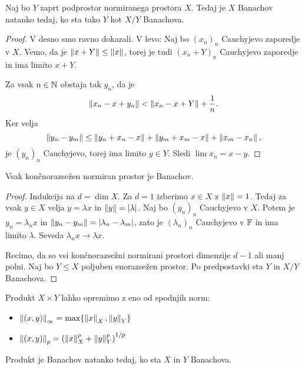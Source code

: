 \begin{trditev}
  Naj bo $Y$ zaprt podprostor normiranega prostora $X$.
  Tedaj je $X$ Banachov natanko tedaj, ko sta tako $Y$ kot $X/Y$ Banachova.
\end{trditev}

\begin{proof}
  V desno smo ravno dokazali.
  V levo:
  Naj bo $(x_n)_n$ Cauchyjevo zaporedje v $X$.
  Vemo, da je $\left\lVert x + Y\right\rVert \le \left\lVert x\right\rVert$, torej je tudi $(x_n + Y)_n$
  Cauchyjevo zaporedje in ima limito $x + Y$.

  Za vsak $n \in \mathbb{N}$ obstaja tak $y_n$, da je
  \[
	\left\lVert x_n - x + y_n\right\rVert < \left\lVert x_n - x + Y\right\rVert + \frac{1}{n}.
  \]
  Ker velja
  \[
	\left\lVert y_n - y_m\right\rVert \le \left\lVert y_n + x_n - x\right\rVert + \left\lVert y_m + x_m - x\right\rVert + \left\lVert x_m
	- x_n\right\rVert,
  \]
  je $(y_n)_n$ Cauchyjevo, torej ima limito $y \in Y$.
  Sledi $\lim x_n = x - y$.
\end{proof}

\begin{posledica}
  Vsak končnorazsežen normiran prostor je Banachov.
\end{posledica}

\begin{proof}
  Indukcija na $d = \dim X$.
  Za $d = 1$ izberimo $x \in X$ z $\left\lVert x\right\rVert = 1$.
  Tedaj za vsak $y \in X$ velja $y = \lambda x$ in $\left\lVert y\right\rVert = \left| \lambda \right|$.
  Naj bo $(y_n)_n$ Cauchyjevo v $X$.
  Potem je $y_n = \lambda_n x$ in $\left\lVert y_n - y_m\right\rVert = \left| \lambda_n -
	\lambda_m \right|$,
  zato je $(\lambda_n)_n$ Cauchyjevo v $\mathbb{F}$ in ima limito $\lambda$.
  Seveda $\lambda_n x \to \lambda x$.

  Recimo, da so vsi končnorazsežni normirani prostori dimenzije $d-1$ ali manj
  polni.
  Naj bo $Y \le X$ poljuben enorazsežen prostor.
  Po predpostavki sta $Y$ in $X/Y$ Banachova.
\end{proof}

Produkt $X \times Y$ lahko opremimo z eno od spodnjih norm:
\begin{itemize}
\item $\left\lVert(x,y)\right\rVert_\infty = \max \{ \left\lVert x\right\rVert_X, \left\lVert y\right\rVert_Y \}$
\item $\left\lVert(x,y)\right\rVert_p = \left( \left\lVert x\right\rVert_X^p + \left\lVert y\right\rVert_Y^p \right)^{1/p}$
\end{itemize}
Produkt je Banachov natanko tedaj, ko sta $X$ in $Y$ Banachova.

